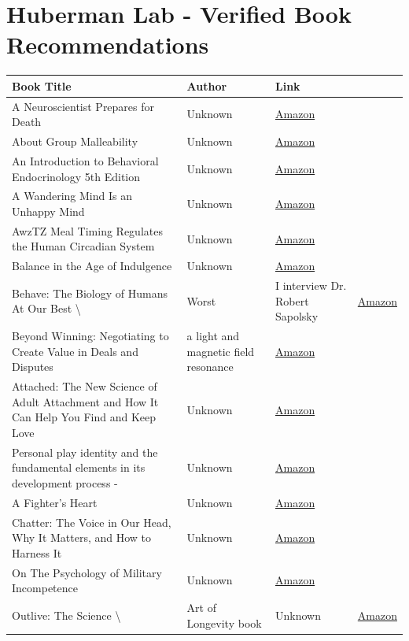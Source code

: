 \documentclass{article}
\begin{document}
\section{Huberman Lab - Verified Book Recommendations}

\begin{longtable}{|p{8cm}|p{4cm}|p{2.5cm}|}
\hline
\textbf{Book Title} & \textbf{Author} & \textbf{Link} \\
\hline
A Neuroscientist Prepares for Death & Unknown & \href{https://amzn.to/3slCpRl}{Amazon} \\
\hline
About Group Malleability & Unknown & \href{https://amzn.to/3VXPFIo}{Amazon} \\
\hline
An Introduction to Behavioral Endocrinology 5th Edition & Unknown & \href{https://amzn.to/396bHm9}{Amazon} \\
\hline
A Wandering Mind Is an Unhappy Mind & Unknown & \href{https://amzn.to/42nMx9H}{Amazon} \\
\hline
AwzTZ
Meal Timing Regulates the Human Circadian System & Unknown & \href{https://amzn.to/3dfsncH}{Amazon} \\
\hline
Balance in the Age of Indulgence & Unknown & \href{https://amzn.to/3E3Und5}{Amazon} \\
\hline
Behave: The Biology of Humans At Our Best \textbackslash{}& Worst & I interview Dr. Robert Sapolsky & \href{https://amzn.to/3yrZ6k7}{Amazon} \\
\hline
Beyond Winning: Negotiating to Create Value in Deals and Disputes & a light and magnetic field resonance & \href{https://amzn.to/3uSBjOd}{Amazon} \\
\hline
Attached: The New Science of Adult Attachment and How It Can Help You Find and Keep Love & Unknown & \href{https://amzn.to/3HJjXVs}{Amazon} \\
\hline
Personal play identity and the fundamental elements in its development process - & Unknown & \href{https://amzn.to/3uLnC1B}{Amazon} \\
\hline
A Fighter's Heart & Unknown & \href{https://amzn.to/3PUtmQ2}{Amazon} \\
\hline
Chatter: The Voice in Our Head, Why It Matters, and How to Harness It & Unknown & \href{https://amzn.to/3QaS0Nw}{Amazon} \\
\hline
On The Psychology of Military Incompetence & Unknown & \href{https://amzn.to/3RCRk3R}{Amazon} \\
\hline
Outlive: The Science \textbackslash{}& Art of Longevity book & Unknown & \href{https://amzn.to/47TJ6tQ}{Amazon} \\

\end{longtable}
\end{document}

